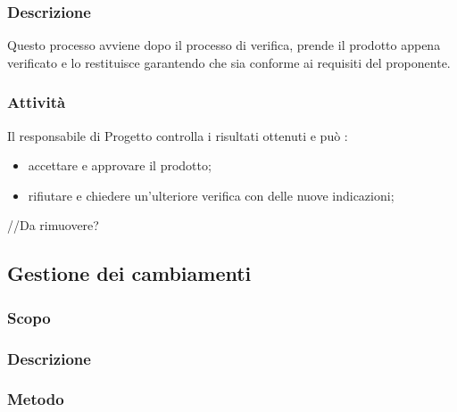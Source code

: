 \subsubsection{Descrizione}
Questo processo avviene dopo il processo di verifica, prende il prodotto appena verificato e lo restituisce garantendo che sia conforme ai requisiti del proponente.

\subsubsection{Attività}
Il responsabile di Progetto controlla i risultati ottenuti e può :
\begin{itemize}
\item accettare e approvare il prodotto;
\item rifiutare e chiedere un’ulteriore verifica con delle nuove indicazioni;
\end{itemize}


//Da rimuovere?
\subsection{Gestione dei cambiamenti}
\subsubsection{Scopo}
\subsubsection{Descrizione}
\subsubsection{Metodo}
